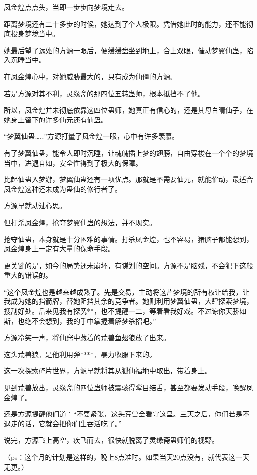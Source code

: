 \begin{this_body}
凤金煌点点头，当即一步步向梦境走去。

距离梦境还有二十多步的时候，她达到了个人极限。凭借她此时的能力，还不能彻底投身梦境当中。

她最后望了远处的方源一眼后，便缓缓盘坐到地上，合上双眼，催动梦翼仙蛊，陷入沉睡当中。

在凤金煌心中，对她威胁最大的，只有成为仙僵的方源。

若是方源对其不利，灵缘斋的那四位五转蛊师，根本抵挡不了他。

所以，凤金煌并未彻底依靠这四位蛊师，她真正有信心的，还是其母白晴仙子，在她身上留下的许多仙元还有仙蛊。

“梦翼仙蛊……”方源打量了凤金煌一眼，心中有许多羡慕。

有了梦翼仙蛊，能令人即时沉睡，让魂魄插上梦的翅膀，自由穿梭在一个个的梦境当中，进退自如，安全性得到了极大的保障。

比起仙蛊入梦游，梦翼仙蛊还有一项优点。那就是不需要仙元，就能催动，最适合凤金煌这种还未成为蛊仙的修行者了。

方源早就动过心思。

但打杀凤金煌，抢夺梦翼仙蛊的想法，并不现实。

抢夺仙蛊，本身就是十分困难的事情。打杀凤金煌，也不容易，猪脑子都能想到，凤金煌身上一定有大量的保命手段。

更关键的是，如今的局势还未崩坏，有谋划的空间。方源不是脑残，不会犯下这般重大的错误的。

“这个凤金煌也是越来越成熟了。先是交易，主动将这片梦境的所有权让给我，让我成为她的挡箭牌，替她阻挡其余的竞争者。她则利用梦翼仙蛊，大肆探索梦境，搜刮好处。后来见我有探究**，也不提醒一二，等着看我好戏。不过谅你天骄如斯，也绝不会想到，我的手中掌握着解梦杀招吧。”

方源冷笑一声，将仙窍中藏着的荒兽鱼翅狼放了出来。

这头荒兽狼，是他利用弹****，暴力收服下来的。

这一次探索碎片世界，方源早就将其从狐仙福地中取出，带着身上。

见到荒兽放出，灵缘斋的四位蛊师被震骇得瞠目结舌，甚至都要发动手段，唤醒凤金煌了。

还是方源提醒他们道：“不要紧张，这头荒兽会看守这里。三天之后，你们若是不退走的话，它就会把你们生吞活吃了。”

说完，方源飞上高空，疾飞而去，很快就脱离了灵缘斋蛊师们的视野。

（ps：这个月的计划是这样的，晚上8点准时。如果当天20点没有，就代表这一天无更。）

\end{this_body}

